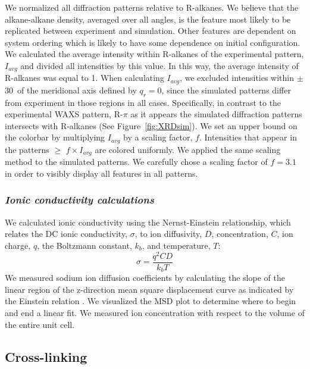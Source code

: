 \documentclass[journal=jpcbfk,manuscript=article]{achemso}
\begin{document}
  We normalized all diffraction patterns relative to R-alkanes. We believe that the
  alkane-alkane density, averaged over all angles, is the feature most likely to be
  replicated between experiment and simulation. Other features are dependent on 
  system ordering which is likely to have some dependence on initial configuration. 
  We calculated the average intensity within R-alkanes of the experimental pattern,
  $I_{avg}$ and divided all intensities by this value. In this way, the average intensity
  of R-alkanes was equal to 1. When calculating $I_{avg}$, we excluded intensities 
  within $\pm$ 30\degree~of the meridional axis defined by $q_r=0$, since the simulated
  patterns differ from experiment in those regions in all cases. Specifically, in contrast
  to the experimental WAXS pattern, R-$\pi$ as it appears the simulated diffraction 
  patterns intersects with R-alkanes (See Figure~\ref{fig:XRDsim}). We set
  an upper bound on the colorbar by multiplying $I_{avg}$ by a scaling factor, $f$. 
  Intensities that appear in the patterns $\geq$ $f\times I_{avg}$ are colored uniformly. 
  We applied the same scaling method to the simulated patterns. We carefully chose a scaling
  factor of $f=3.1$ in order to visibly display all features in all patterns.

  \subsubsection{\textit{Ionic conductivity calculations}}

  We calculated ionic conductivity using the Nernst-Einstein relationship, which 
  relates the DC ionic conductivity, $\sigma$, to ion diffusivity, $D$, 
  concentration, $C$, ion charge, $q$, the Boltzmann constant, $k_b$, and 
  temperature, $T$: 
  \begin{equation}
	\sigma = \dfrac{q^2CD}{k_b T} 
	\label{eqn:nernst_einstein}
  \end{equation}
  We measured sodium ion diffusion coefficients by calculating the slope
  of the linear region of the z-direction mean square displacement curve as
  indicated by the Einstein relation \cite{einstein_investigations_1956}. We
  visualized the MSD plot to determine where to begin and end a linear fit. We
  measured ion concentration with respect to the volume of the entire unit cell. 
  
  \subsection{Cross-linking}
  
\end{document}
